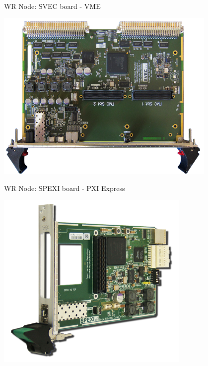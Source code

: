 \documentclass[compress,red]{beamer}
\begin{document}
\begin{frame}{WR Node: SVEC board - VME}
    \begin{center}
      \includegraphics[width=0.8\textwidth]{node/svectop_s.png}
    \end{center}
\end{frame}


\begin{frame}{WR Node: SPEXI board - PXI Express}
    \begin{center}
      \includegraphics[width=0.7\textwidth]{node/spexi_v0.png} 
    \end{center}
\end{frame}
\end{document}

